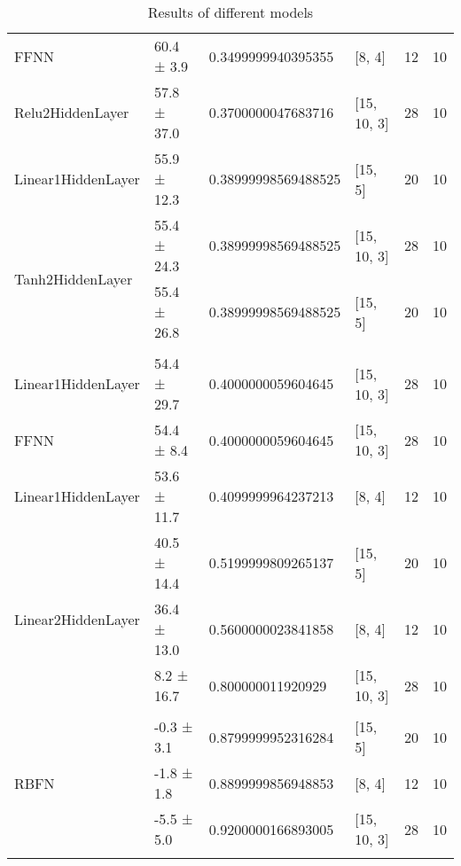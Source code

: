 \begin{table*}
\begin{tabular}{llllll}
 FFNN                                & 60.4 ± 3.9  & 0.3499999940395355  & [8, 4]         & 12         & 10       \\
 Relu2HiddenLayer                    & 57.8 ± 37.0 & 0.3700000047683716  & [15, 10, 3]    & 28         & 10       \\
 Linear1HiddenLayer                  & 55.9 ± 12.3 & 0.38999998569488525 & [15, 5]        & 20         & 10       \\
 \multirow{2}{*}{Tanh2HiddenLayer}   & 55.4 ± 24.3 & 0.38999998569488525 & [15, 10, 3]    & 28         & 10       \\
 Tanh2HiddenLayer                    & 55.4 ± 26.8 & 0.38999998569488525 & [15, 5]        & 20         & 10       \\
                                     &             &                     &                &            &          \\
 Linear1HiddenLayer                  & 54.4 ± 29.7 & 0.4000000059604645  & [15, 10, 3]    & 28         & 10       \\
 FFNN                                & 54.4 ± 8.4  & 0.4000000059604645  & [15, 10, 3]    & 28         & 10       \\
 Linear1HiddenLayer                  & 53.6 ± 11.7 & 0.4099999964237213  & [8, 4]         & 12         & 10       \\
 \multirow{3}{*}{Linear2HiddenLayer} & 40.5 ± 14.4 & 0.5199999809265137  & [15, 5]        & 20         & 10       \\
 Linear2HiddenLayer                  & 36.4 ± 13.0 & 0.5600000023841858  & [8, 4]         & 12         & 10       \\
 Linear2HiddenLayer                  & 8.2 ± 16.7  & 0.800000011920929   & [15, 10, 3]    & 28         & 10       \\
                                     &             &                     &                &            &          \\
 \multirow{3}{*}{RBFN}               & -0.3 ± 3.1  & 0.8799999952316284  & [15, 5]        & 20         & 10       \\
 RBFN                                & -1.8 ± 1.8  & 0.8899999856948853  & [8, 4]         & 12         & 10       \\
 RBFN                                & -5.5 ± 5.0  & 0.9200000166893005  & [15, 10, 3]    & 28         & 10       \\
                                     &             &                     &                &            &          \\
\hline
\end{tabular}
        \caption{Results of different models}
        \label{models}
    \end{table*}
    

